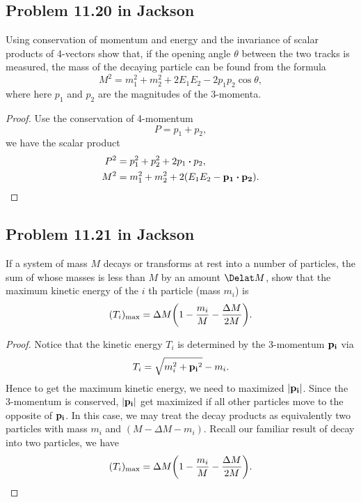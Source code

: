 \documentclass[10pt]{article}
\begin{document}
\subsection{Problem 11.20 in Jackson}
Using conservation of momentum and energy and the invariance of scalar products of 4-vectors show that, if the opening angle $\theta$ between the two tracks is measured, the mass of the decaying particle can be found from the formula 
\begin{equation}
	M^2 = m_1^2 + m_2^2 + 2E_1 E_2 - 2p_1 p_2 \cos{\theta},
\end{equation}
where here $p_1$ and $p_2$ are the magnitudes of the 3-momenta.
\begin{proof}
	Use the conservation of 4-momentum
	\begin{equation}
		P = p_1 + p_2,
	\end{equation}
	we have the scalar product 
	\begin{align*}
		P^2 &= p_1^2 + p_2^2 + 2 p_1 \vdot p_2, \\
		M^2 &= m_1^2 + m_2^2 + 2 (E_1E_2 - \vb{p_1} \vdot \vb{p_2}).
	\end{align*}
\end{proof}
\subsection{Problem 11.21 in Jackson}
If a system of mass $M$ decays or transforms at rest into a number of particles, the sum of whose masses is less than $M$ by an amount $\Delat M$, show that the maximum kinetic energy of the $i$ th particle (mass $m_i$) is 
\begin{equation}
	(T_i)_{\max} = \Delta M \qty(1 - \frac{m_i}{M} - \frac{\Delta M}{2M}).
\end{equation}
\begin{proof}
	Notice that the kinetic energy $T_i$ is determined by the 3-momentum $\vb{p_i}$ via 
	\begin{equation}
		T_i = \sqrt{m_i^2 + \vb{p_i}^2} - m_i.
	\end{equation}
	Hence to get the maximum kinetic energy, we need to maximized $\abs{\vb{p_i}}$. Since the 3-momentum is conserved, $\abs{\vb{p_i}}$ get maximized if all other particles move to the opposite of $\vb{p_i}$. In this case, we may treat the decay products as equivalently two particles with mass $m_i$ and $(M - \Delta M - m_i)$. Recall our familiar result of decay into two particles, we have 
	\begin{equation}
		(T_i)_{\max} = \Delta M \qty(1 - \frac{m_i}{M} - \frac{\Delta M}{2M}).
	\end{equation}
\end{proof}
\end{document}
